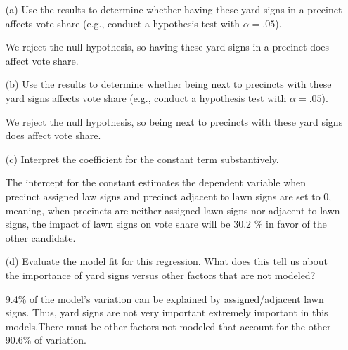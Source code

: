 \documentclass[12pt,letterpaper]{article}
\begin{document}
\vspace{.5cm}
\begin{enumerate}
	\item [(a)] Use the results to determine whether having these yard signs in a precinct affects vote share (e.g., conduct a hypothesis test with $\alpha = .05$).
	
	  
	We reject the null hypothesis, so having these yard signs in a precinct does affect vote share.
		
	\newpage
	\item [(b)]  Use the results to determine whether being next to precincts with these yard signs affects vote share (e.g., conduct a hypothesis test with $\alpha = .05$).
	
	  
	We reject the null hypothesis, so being next to precincts with these yard signs does affect vote share.
	
	\vspace{.5cm}
	\item [(c)] Interpret the coefficient for the constant term substantively.
	
	\vspace{.1cm}
	The intercept for the constant estimates the dependent variable when precinct assigned law signs and precinct adjacent to lawn signs are set to 0, 
meaning, when precincts are neither assigned lawn signs nor adjacent to lawn signs, the impact of lawn signs on vote share will be 30.2 \% in favor of the other candidate.
	
	\item [(d)] Evaluate the model fit for this regression.  What does this	tell us about the importance of yard signs versus other factors that are not modeled?
	
	\vspace{.1cm}
	9.4\% of the model's variation can be explained by assigned/adjacent lawn signs. Thus, yard signs are not very important extremely important in this models.There must be other factors not modeled that account for the other 90.6\% of variation. 

	
\end{enumerate}  

\newpage
\end{document}
